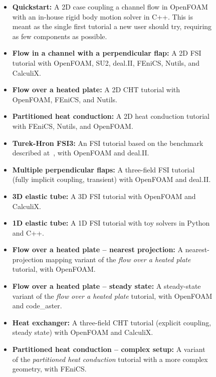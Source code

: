 \begin{figure}[h!]
\centering
\small
\begin{framed}
\begin{minipage}{\textwidth}
  \begin{minipage}{0.5\textwidth}
    \begin{itemize}[leftmargin=*]
      \item \textbf{Quickstart:} A 2D case coupling a channel flow in OpenFOAM with an in-house rigid body motion solver in C++.
      This is meant as the single first tutorial a new user should try, requiring as few components as possible.
      \item \textbf{Flow in a channel with a perpendicular flap:} A 2D FSI tutorial with OpenFOAM, SU2, deal.II, FEniCS, Nutils, and CalculiX.
      \item \textbf{Flow over a heated plate:} A 2D CHT tutorial with OpenFOAM, FEniCS, and Nutils.
      \item \textbf{Partitioned heat conduction:} A 2D heat conduction tutorial with FEniCS, Nutils, and OpenFOAM.
      \item \textbf{Turek-Hron FSI3:} An FSI tutorial based on the benchmark described at~\cite{turek2006proposal}, with OpenFOAM and deal.II.
      \item \textbf{Multiple perpendicular flaps:} A three-field FSI tutorial (fully implicit coupling, transient) with OpenFOAM and deal.II.
      \item \textbf{3D elastic tube:} A 3D FSI tutorial with OpenFOAM and CalculiX.
    \end{itemize}  
  \end{minipage}\hfill
  \begin{minipage}{0.5\textwidth}
    \begin{itemize}
      \item \textbf{1D elastic tube:} A 1D FSI tutorial with toy solvers in Python and C++.
      \item \textbf{Flow over a heated plate -- nearest projection:} A nearest-projection mapping variant of the \emph{flow over a heated plate} tutorial, with OpenFOAM.
      \item \textbf{Flow over a heated plate -- steady state:} A steady-state variant of the \emph{flow over a heated plate} tutorial, with OpenFOAM and code\_aster.
      \item \textbf{Heat exchanger:} A three-field CHT tutorial (explicit coupling, steady state) with OpenFOAM and CalculiX.
      \item \textbf{Partitioned heat conduction -- complex setup:} A variant of the \emph{partitioned heat conduction} tutorial with a more complex geometry, with FEniCS.

\end{itemize}
\end{minipage}
\end{minipage}
\end{framed}
\end{figure}
